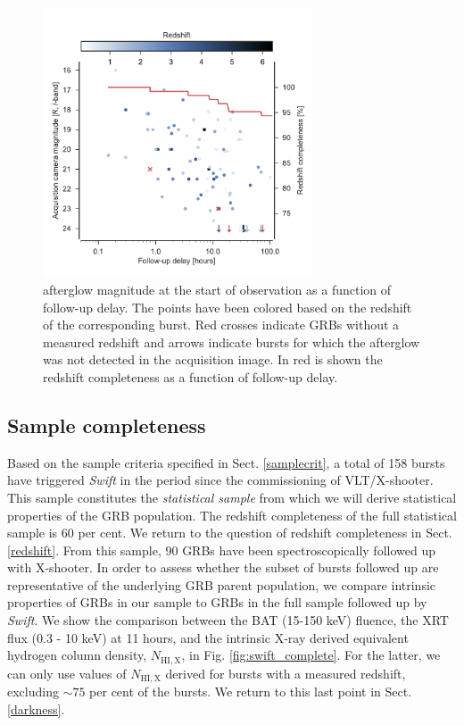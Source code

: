 \documentclass{aa}    %
\begin{document}
\begin{figure}
	\centerline{\includegraphics[width=8cm]{figures/timing.pdf}} \caption{afterglow
	magnitude at the start of observation as a function of follow-up delay. The
	points have been colored based on the redshift of the corresponding burst. Red
	crosses indicate GRBs without a measured redshift and arrows indicate bursts
	for which the afterglow was not detected in the acquisition image. In red is
	shown the redshift completeness as a function of follow-up delay.}
\label{fig:timing}
\end{figure}
\subsection{Sample completeness} \label{completeness}

Based on the sample criteria specified in Sect. \ref{samplecrit}, a total of 158
bursts have triggered \textit{Swift} in the period since the commissioning of
VLT/X-shooter. This sample constitutes the \textit{statistical sample} from
which we will derive statistical properties of the GRB population. The redshift
completeness of the full statistical sample is 60 per cent. We return to the
question of redshift completeness in Sect. \ref{redshift}. From this sample,
90 GRBs have been spectroscopically followed up with X-shooter. In order to
assess whether the subset of bursts followed up are representative of the
underlying GRB parent population, we compare intrinsic properties of GRBs in our
sample to GRBs in the full sample followed up by \textit{Swift}. We show the
comparison between the BAT (15-150 keV) fluence, the XRT flux (0.3 - 10 keV) at
11 hours, and the intrinsic X-ray derived equivalent hydrogen column density,
$N_{\mathrm{HI,X}}$, in Fig. \ref{fig:swift_complete}. For the latter, we can
only use values of $N_{\mathrm{HI,X}}$ derived for bursts with a measured
redshift, excluding $\sim 75$ per cent of the bursts. We return to this last
point in Sect. \ref{darkness}.
\end{document}

